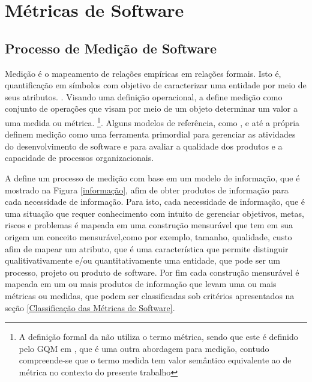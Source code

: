 \chapter{Métricas de Software}

\section{Processo de Medição de Software}

Medição é o mapeamento de relações empíricas em relações formais. Isto 
é, quantificação em símbolos com objetivo de caracterizar uma entidade por 
meio de seus atributos. \cite{Fenton98}. Visando uma definição operacional, a 
 define medição como conjunto de operações que visam 
por meio de um objeto determinar um valor a uma medida ou métrica. \footnote{A 
definição formal da  não utiliza o termo métrica, 
sendo que este é definido pelo GQM em , que é uma outra 
abordagem para medição, contudo compreende-se que o termo medida tem valor 
semântico equivalente ao de métrica no contexto do presente trabalho}. Alguns 
modelos de referência, como , e até a própria 
 definem medição como uma ferramenta primordial para 
gerenciar as atividades do desenvolvimento de software e para avaliar a 
qualidade dos produtos e a capacidade de processos organizacionais. 


A  define um processo de medição com base em um modelo de 
informação, que é mostrado na Figura \ref{informação}, afim de obter produtos de 
informação para cada necessidade de informação. Para isto, cada necessidade de 
informação, que é uma situação que requer conhecimento com intuito de 
gerenciar objetivos, metas, riscos e problemas é mapeada em uma construção 
mensurável que tem em sua origem um conceito mensurável,como por exemplo, 
tamanho, qualidade, custo afim de mapear um atributo, que é uma característica 
que permite distinguir qualitivativamente e/ou quantitativamente
uma entidade, que pode ser um processo, projeto ou produto de software. Por fim 
cada construção mensurável é mapeada em um ou mais produtos de informação que 
levam uma ou mais métricas ou medidas, que podem ser classificadas sob 
critérios apresentados na seção \ref{Classificação das Métricas de Software}. 

